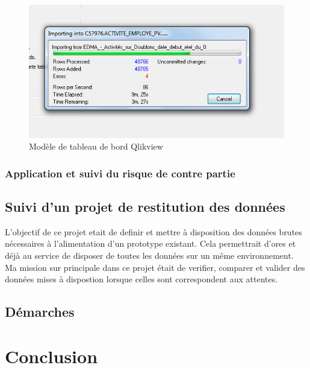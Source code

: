 \documentclass[11pt,a4paper]{article}
\begin{document}
     
\begin{figure}[h]
 \centering
 \includegraphics[scale=0.5]{import_fichier_toad.PNG}
 \caption{Modèle de tableau de bord Qlikview}
 \label{figure_cm}
\end{figure}
     \subsubsection{Application et suivi du risque de contre partie}
     
     
\subsection{Suivi d'un projet de restitution des données}
L'objectif de ce projet etait de definir et mettre à disposition des données brutes nécessaires à l’alimentation d'un prototype existant. Cela permettrait d’ores et déjà au service de disposer de toutes les données sur un même environnement. Ma mission sur principale dans ce projet était de verifier, comparer et valider des données mises à dispostion lorsque celles sont correspondent aux attentes. 

\subsection{Démarches}
\newpage
\section{Conclusion}
 
 

\newpage


 \newpage
 

\end{document}
